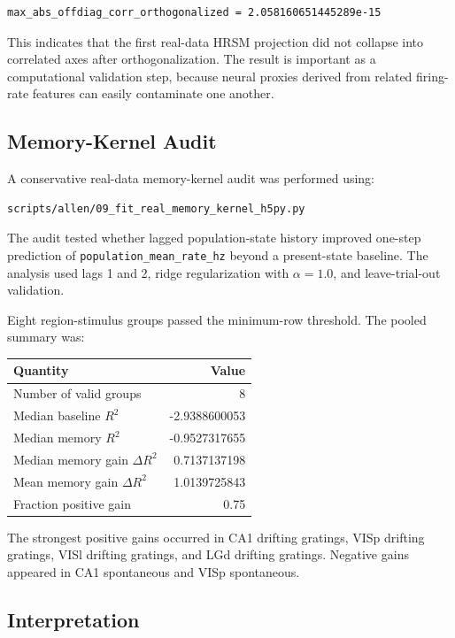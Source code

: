 \begin{verbatim}
max_abs_offdiag_corr_orthogonalized = 2.058160651445289e-15
\end{verbatim}

This indicates that the first real-data HRSM projection did not collapse into correlated axes after orthogonalization. The result is important as a computational validation step, because neural proxies derived from related firing-rate features can easily contaminate one another.

\subsection{Memory-Kernel Audit}

A conservative real-data memory-kernel audit was performed using:

\begin{verbatim}
scripts/allen/09_fit_real_memory_kernel_h5py.py
\end{verbatim}

The audit tested whether lagged population-state history improved one-step prediction of \texttt{population\_mean\_rate\_hz} beyond a present-state baseline. The analysis used lags 1 and 2, ridge regularization with \(\alpha = 1.0\), and leave-trial-out validation.

Eight region-stimulus groups passed the minimum-row threshold. The pooled summary was:

\begin{center}
\begin{tabular}{lr}
\hline
Quantity & Value \\
\hline
Number of valid groups & 8 \\
Median baseline \(R^2\) & -2.9388600053 \\
Median memory \(R^2\) & -0.9527317655 \\
Median memory gain \(\Delta R^2\) & 0.7137137198 \\
Mean memory gain \(\Delta R^2\) & 1.0139725843 \\
Fraction positive gain & 0.75 \\
\hline
\end{tabular}
\end{center}

The strongest positive gains occurred in CA1 drifting gratings, VISp drifting gratings, VISl drifting gratings, and LGd drifting gratings. Negative gains appeared in CA1 spontaneous and VISp spontaneous.

\subsection{Interpretation}

